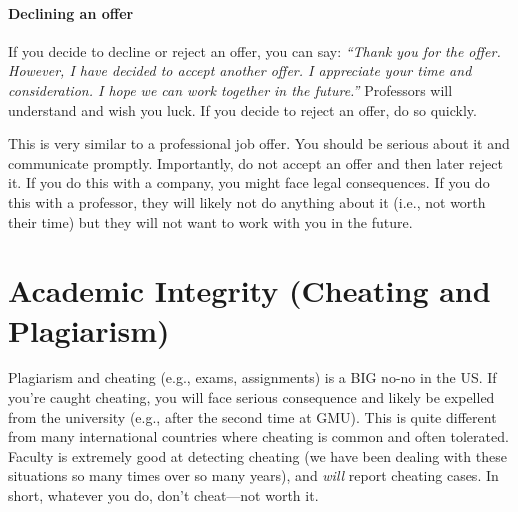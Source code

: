 \documentclass[oneside,11pt,dvipsnames]{book}
\begin{document}
\paragraph{Declining an offer} If you decide to decline or reject an offer, you can say: \emph{``Thank you for the offer. However, I have decided to accept another offer.  I appreciate your time and consideration.  I hope we can work together in the future.''}  Professors will understand and wish you luck.  If you decide to reject an offer, do so quickly.

This is very similar to a professional job offer.  You should be serious about it and communicate promptly. Importantly, do not accept an offer and then later reject it.  If you do this with a company, you might face legal consequences.  If you do this with a professor, they will likely not do anything about it (i.e., not worth their time) but they will not want to work with you in the future.




\section{Academic Integrity (Cheating and Plagiarism)}

Plagiarism and cheating (e.g., exams, assignments) is a BIG no-no in the US.  If you're caught cheating, you will face serious consequence and likely be expelled from the university (e.g., after the second time at GMU).   This is quite different from many international countries where cheating is common and often tolerated.  Faculty is extremely good at detecting cheating (we have been dealing with these situations so many times over so many years), and \emph{will} report cheating cases.  In short, whatever you do, don't cheat---not worth it.
\end{document}
